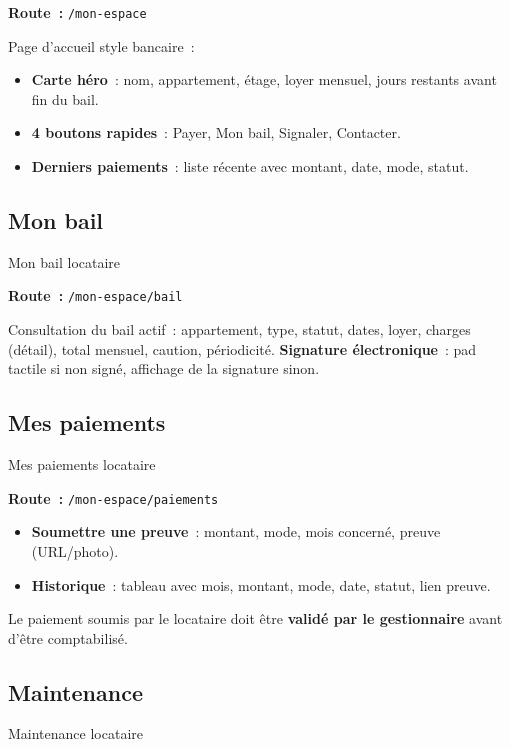 \documentclass[12pt,a4paper]{article}
\begin{document}
\textbf{Route~:} \texttt{/mon-espace}

Page d'accueil style bancaire~:
\begin{itemize}
\item \textbf{Carte h\'ero}~: nom, appartement, \'etage, loyer mensuel, jours restants avant fin du bail.
\item \textbf{4 boutons rapides}~: Payer, Mon bail, Signaler, Contacter.
\item \textbf{Derniers paiements}~: liste r\'ecente avec montant, date, mode, statut.
\end{itemize}

\subsection{\texorpdfstring{\faFileContract}{} Mon bail}{Mon bail locataire}

\textbf{Route~:} \texttt{/mon-espace/bail}

Consultation du bail actif~: appartement, type, statut, dates, loyer, charges (d\'etail), total mensuel, caution, p\'eriodicit\'e. \textbf{Signature \'electronique}~: pad tactile si non sign\'e, affichage de la signature sinon.

\subsection{\texorpdfstring{\faMoneyBill}{} Mes paiements}{Mes paiements locataire}

\textbf{Route~:} \texttt{/mon-espace/paiements}

\begin{itemize}
\item \textbf{Soumettre une preuve}~: montant, mode, mois concern\'e, preuve (URL/photo).
\item \textbf{Historique}~: tableau avec mois, montant, mode, date, statut, lien preuve.
\end{itemize}

\begin{warnbox}
Le paiement soumis par le locataire doit \^etre \textbf{valid\'e par le gestionnaire} avant d'\^etre comptabilis\'e.
\end{warnbox}

\subsection{\texorpdfstring{\faWrench}{} Maintenance}{Maintenance locataire}
\end{document}
